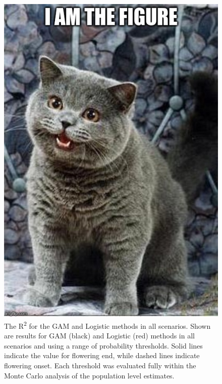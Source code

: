 \begin{figure}
	\centering
	\includegraphics[scale=0.5]{images/figure_filler.jpg}
	\caption[The R\textsuperscript{2} for the GAM and Logistic methods in all scenarios]{The R\textsuperscript{2} for the GAM and Logistic methods in all scenarios. Shown are results for  GAM (black) and Logistic (red) methods in all scenarios and using a range of probability thresholds. Solid lines indicate the value for flowering end, while dashed lines indicate flowering onset. Each threshold was evaluated fully within the Monte Carlo analysis of the population level estimates.} \label{fig-b-4}
\end{figure}

